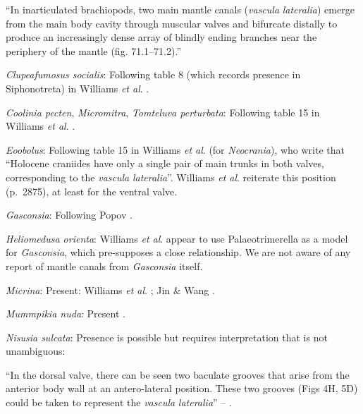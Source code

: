 \documentclass[openany]{book}
\theoremstyle{definition}
\theoremstyle{definition}
\theoremstyle{definition}
\theoremstyle{remark}
\begin{document}
``In inarticulated brachiopods, two main mantle canals (\emph{vascula}
\emph{lateralia}) emerge from the main body cavity through muscular
valves and bifurcate distally to produce an increasingly dense array of
blindly ending branches near the periphery of the mantle (fig.
71.1--71.2).''

\hypertarget{Clupeafumosus_socialis-coding-32}{}
\emph{Clupeafumosus socialis}: Following table 8 (which records presence
in Siphonotreta) in Williams \emph{et al}.
\citeyearpar{Williams2000LinguliformeaCraniiformea}.

\hypertarget{Coolinia_pecten-coding-32}{}
\emph{Coolinia pecten}, \emph{Micromitra}, \emph{Tomteluva perturbata}:
Following table 15 in Williams \emph{et al}.
\citeyearpar{Williams2000LinguliformeaCraniiformea}.

\hypertarget{Eoobolus-coding-32}{}
\emph{Eoobolus}: Following table 15 in Williams \emph{et al}.
\citeyearpar{Williams2000LinguliformeaCraniiformea} (for
\emph{Neocrania}), who write that ``Holocene craniides have only a
single pair of main trunks in both valves, corresponding to the
\emph{vascula} \emph{lateralia}''. Williams \emph{et al}.
\citeyearpar{Williams2007Supplement} reiterate this position (p.~2875),
at least for the ventral valve.

\hypertarget{Gasconsia-coding-32}{}
\emph{Gasconsia}: Following Popov \citeyearpar{Popov1992TheCambrian}.

\hypertarget{Heliomedusa_orienta-coding-32}{}
\emph{Heliomedusa orienta}: Williams \emph{et al}. \citeyearpar[table
15]{Williams2000LinguliformeaCraniiformea} appear to use
Palaeotrimerella \citep[as drawn in][]{Williams1997Introduction} as a
model for \emph{Gasconsia}, which pre-supposes a close relationship. We
are not aware of any report of mantle canals from \emph{Gasconsia}
itself.

\hypertarget{Micrina-coding-32}{}
\emph{Micrina}: Present: Williams \emph{et al}.
\citeyearpar{Williams2000LinguliformeaCraniiformea}; Jin \& Wang
\citeyearpar{Jin1992Revisionof}.

\hypertarget{Mummpikia_nuda-coding-32}{}
\emph{Mummpikia nuda}: Present
\citep{Williams2000LinguliformeaCraniiformea}.

\hypertarget{Nisusia_sulcata-coding-32}{}
\emph{Nisusia sulcata}: Presence is possible but requires interpretation
that is not unambiguous:

``In the dorsal valve, there can be seen two baculate grooves that arise
from the\\
anterior body wall at an antero-lateral position. These two grooves
(Figs 4H, 5D) could be taken to represent the \emph{vascula}
\emph{lateralia}'' -- \citet{Zhang2007Agregarious}.
\end{document}
